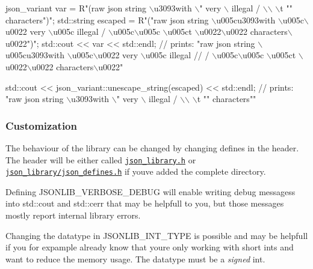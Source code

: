\begin{DoxyCode}
json\_variant var = R\textcolor{stringliteral}{"(raw json string \(\backslash\)u3093with \(\backslash\)" very \(\backslash\) }
\textcolor{stringliteral}{                      illegal / \(\backslash\)\(\backslash\) \(\backslash\)t "" characters")";}
\textcolor{stringliteral}{}
\textcolor{stringliteral}{std::string escaped = R}\textcolor{stringliteral}{"("raw json string \(\backslash\)u005cu3093with \(\backslash\)u005c\(\backslash\)u0022 very }
\textcolor{stringliteral}{                          \(\backslash\)u005c illegal / \(\backslash\)u005c\(\backslash\)u005c \(\backslash\)u005ct \(\backslash\)u0022\(\backslash\)u0022 }
\textcolor{stringliteral}{                          characters\(\backslash\)u0022")";}
\textcolor{stringliteral}{}
\textcolor{stringliteral}{std::cout << var << std::endl;}
\textcolor{stringliteral}{}\textcolor{comment}{// prints: "raw json string \(\backslash\)u005cu3093with \(\backslash\)u005c\(\backslash\)u0022 very \(\backslash\)u005c illegal }
\textcolor{comment}{//          / \(\backslash\)u005c\(\backslash\)u005c \(\backslash\)u005ct \(\backslash\)u0022\(\backslash\)u0022 characters\(\backslash\)u0022"}

std::cout << json\_variant::unescape\_string(escaped) << std::endl;
\textcolor{comment}{// prints: "raw json string \(\backslash\)u3093with \(\backslash\)" very \(\backslash\) illegal / \(\backslash\)\(\backslash\) \(\backslash\)t "" characters""}
\end{DoxyCode}


\subsubsection*{\label{_customization_section}%
Customization}

The behaviour of the library can be changed by changing defines in the header. The header will be either called \href{https://github.com/n0dex/cppjsonlib/blob/master/json_library.h}{\tt json\+\_\+library.\+h} or \href{https://github.com/n0dex/cppjsonlib/blob/master/json_library_source/json_defines.h}{\tt json\+\_\+library/json\+\_\+defines.\+h} if you\textquotesingle{}ve added the complete directory.


\begin{DoxyItemize}
\item Defining {\ttfamily J\+S\+O\+N\+L\+I\+B\+\_\+\+V\+E\+R\+B\+O\+S\+E\+\_\+\+D\+E\+B\+UG} will enable writing debug messagess into {\ttfamily std\+::cout} and {\ttfamily std\+::cerr} that may be helpfull to you, but those messages mostly report internal library errors.
\item Changing the datatype in {\ttfamily J\+S\+O\+N\+L\+I\+B\+\_\+\+I\+N\+T\+\_\+\+T\+Y\+PE} is possible and may be helpfull if you for expample already know that youre only working with short ints and want to reduce the memory usage. The datatype must be a {\itshape signed} int.
\end{DoxyItemize}


